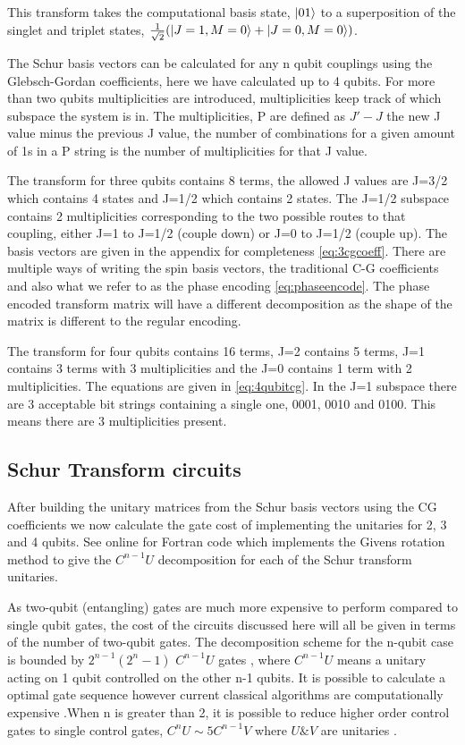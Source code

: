 \documentclass[12pt]{article}
\begin{document}
This transform takes the computational basis state, $\left\vert{01}\right\rangle$ to a superposition of the singlet and triplet states, $\frac{1}{\sqrt{2}} (\left\vert{J=1, M=0}\right\rangle + \left\vert{J=0, M=0}\right\rangle)$. 

The Schur basis vectors can be calculated for any n qubit couplings using the Glebsch-Gordan coefficients, here we have calculated up to 4 qubits. For more than two qubits multiplicities are introduced, multiplicities keep track of which subspace the system is in. The multiplicities, P are defined as $J'-J$ the new J value minus the previous J value, the number of combinations for a given amount of 1s in a P string is the number of multiplicities for that J value.

The transform for three qubits contains 8 terms, the allowed J values are J=3/2 which contains 4 states and J=1/2 which contains 2 states. The J=1/2 subspace contains 2 multiplicities corresponding to the two possible routes to that coupling, either J=1 to J=1/2 (couple down) or J=0 to J=1/2 (couple up). The basis vectors are given in the appendix for completeness \autoref{eq:3cgcoeff}. There are multiple ways of writing the spin basis vectors, the traditional C-G coefficients and also what we refer to as the phase encoding \autoref{eq:phaseencode}. The phase encoded transform matrix will have a different decomposition as the shape of the matrix is different to the regular encoding. 

The transform for four qubits contains 16 terms, J=2 contains 5 terms, J=1 contains 3 terms with 3 multiplicities and the J=0 contains 1 term with 2 multiplicities. The equations are given in \autoref{eq:4qubitcg}. In the J=1 subspace there are 3 acceptable bit strings containing a single one, 0001, 0010 and 0100. This means there are 3 multiplicities present. 

\subsection{Schur Transform circuits}

After building the unitary matrices from the Schur basis vectors using the CG coefficients we now calculate the gate cost of implementing the unitaries for 2, 3 and 4 qubits. See online \cite{githubot561} for Fortran code which implements the Givens rotation method to give the $C^{n-1}U$ decomposition for each of the Schur transform unitaries. 

As two-qubit (entangling) gates are much more expensive to perform compared to single qubit gates, the cost of the circuits discussed here will all be given in terms of the number of two-qubit gates. The decomposition scheme for the n-qubit case is bounded by $2^{n-1}(2^n-1)$ $C^{n-1}U$ gates \cite{li2013decomposition}, where $C^{n-1}U$ means a unitary acting on 1 qubit controlled on the other n-1 qubits. It is possible to calculate a optimal gate sequence however current classical algorithms are computationally expensive \cite{sridharan2010reduce}.When n is greater than 2, it is possible to reduce higher order control gates to single control gates, $C^nU \sim 5 C^{n-1}V$ where $U \& V$ are unitaries \cite{barenco1995elementary}.
\end{document}
